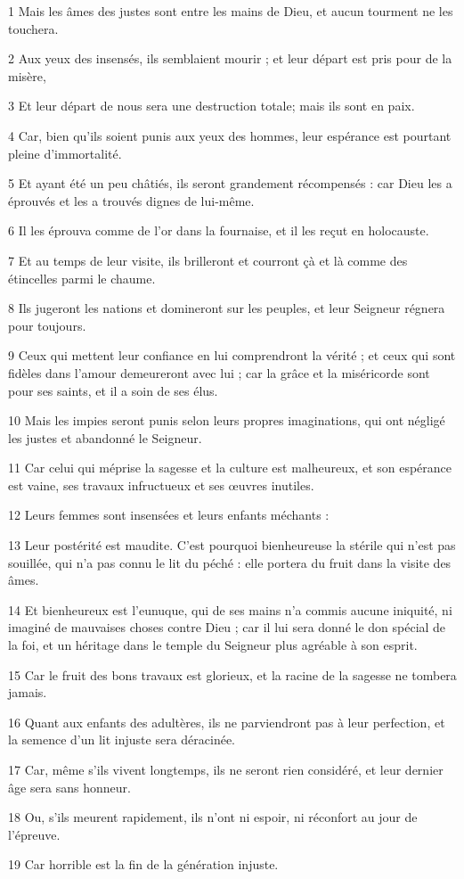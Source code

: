 \par 1 Mais les âmes des justes sont entre les mains de Dieu, et aucun tourment ne les touchera.
\par 2 Aux yeux des insensés, ils semblaient mourir ; et leur départ est pris pour de la misère,
\par 3 Et leur départ de nous sera une destruction totale; mais ils sont en paix.
\par 4 Car, bien qu'ils soient punis aux yeux des hommes, leur espérance est pourtant pleine d'immortalité.
\par 5 Et ayant été un peu châtiés, ils seront grandement récompensés : car Dieu les a éprouvés et les a trouvés dignes de lui-même.
\par 6 Il les éprouva comme de l'or dans la fournaise, et il les reçut en holocauste.
\par 7 Et au temps de leur visite, ils brilleront et courront çà et là comme des étincelles parmi le chaume.
\par 8 Ils jugeront les nations et domineront sur les peuples, et leur Seigneur régnera pour toujours.
\par 9 Ceux qui mettent leur confiance en lui comprendront la vérité ; et ceux qui sont fidèles dans l'amour demeureront avec lui ; car la grâce et la miséricorde sont pour ses saints, et il a soin de ses élus.
\par 10 Mais les impies seront punis selon leurs propres imaginations, qui ont négligé les justes et abandonné le Seigneur.
\par 11 Car celui qui méprise la sagesse et la culture est malheureux, et son espérance est vaine, ses travaux infructueux et ses œuvres inutiles.
\par 12 Leurs femmes sont insensées et leurs enfants méchants :
\par 13 Leur postérité est maudite. C'est pourquoi bienheureuse la stérile qui n'est pas souillée, qui n'a pas connu le lit du péché : elle portera du fruit dans la visite des âmes.
\par 14 Et bienheureux est l'eunuque, qui de ses mains n'a commis aucune iniquité, ni imaginé de mauvaises choses contre Dieu ; car il lui sera donné le don spécial de la foi, et un héritage dans le temple du Seigneur plus agréable à son esprit.
\par 15 Car le fruit des bons travaux est glorieux, et la racine de la sagesse ne tombera jamais.
\par 16 Quant aux enfants des adultères, ils ne parviendront pas à leur perfection, et la semence d'un lit injuste sera déracinée.
\par 17 Car, même s'ils vivent longtemps, ils ne seront rien considéré, et leur dernier âge sera sans honneur.
\par 18 Ou, s'ils meurent rapidement, ils n'ont ni espoir, ni réconfort au jour de l'épreuve.
\par 19 Car horrible est la fin de la génération injuste.

